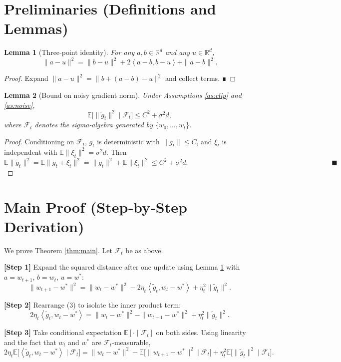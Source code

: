 \documentclass{article}
\newtheorem{lemma}{Lemma}
\newcommand{\EE}{\mathbb{E}}
\newcommand{\RR}{\mathbb{R}}
\newcommand{\inner}[2]{\left\langle #1,#2\right\rangle}
\begin{document}
\newpage
\section*{Preliminaries (Definitions and Lemmas)}
\begin{lemma}[Three‑point identity]\label{lem:3pt}
For any $a,b\in\RR^d$ and any $u\in\RR^d$,
\[
\|a-u\|^2 = \|b-u\|^2 + 2\inner{a-b}{b-u} + \|a-b\|^2 .
\]
\end{lemma}
\begin{proof}
Expand $\|a-u\|^2 = \|b+(a-b)-u\|^2$ and collect terms. ∎
\end{proof}

\begin{lemma}[Bound on noisy gradient norm]\label{lem:noisy}
Under Assumptions \ref{as:clip} and \ref{as:noise},
\[
\EE\big[\|\tilde g_t\|^2\mid \mathcal F_t\big]\le C^2+\sigma^2 d,
\]
where $\mathcal F_t$ denotes the sigma‑algebra generated by $\{w_0,\dots,w_t\}$.
\end{lemma}
\begin{proof}
Conditioning on $\mathcal F_t$, $g_t$ is deterministic with $\|g_t\|\le C$, and $\xi_t$ is independent with $\EE\|\xi_t\|^2=\sigma^2 d$. Then
\[
\EE\|\tilde g_t\|^2 = \EE\|g_t+\xi_t\|^2 = \|g_t\|^2 + \EE\|\xi_t\|^2 \le C^2+\sigma^2 d .
\qquad\qquad\qquad\qquad\qquad\qquad\qquad\qquad\qquad\qquad\;\; \blacksquare
\]
\end{proof}

\section*{Main Proof (Step‑by‑Step Derivation)}
We prove Theorem \ref{thm:main}. Let $\mathcal F_t$ be as above.

\noindent\textbf{[Step 1]} Expand the squared distance after one update using Lemma \ref{lem:3pt} with $a=w_{t+1}$, $b=w_t$, $u=w^*$:
\[
\|w_{t+1}-w^*\|^2 = \|w_t-w^*\|^2 -2\eta_t\inner{\tilde g_t}{w_t-w^*} + \eta_t^2\|\tilde g_t\|^2 .
\tag{3}
\]

\noindent\textbf{[Step 2]} Rearrange (3) to isolate the inner product term:
\[
2\eta_t\inner{\tilde g_t}{w_t-w^*}
= \|w_t-w^*\|^2-\|w_{t+1}-w^*\|^2 + \eta_t^2\|\tilde g_t\|^2 .
\tag{4}
\]

\noindent\textbf{[Step 3]} Take conditional expectation $\EE[\cdot\mid\mathcal F_t]$ on both sides. Using linearity and the fact that $w_t$ and $w^*$ are $\mathcal F_t$‑measurable,
\[
2\eta_t\EE\!\big[\inner{\tilde g_t}{w_t-w^*}\mid\mathcal F_t\big]
= \|w_t-w^*\|^2-\EE\!\big[\|w_{t+1}-w^*\|^2\mid\mathcal F_t\big] + \eta_t^2\EE\!\big[\|\tilde g_t\|^2\mid\mathcal F_t\big].
\tag{5}
\]
\end{document}
